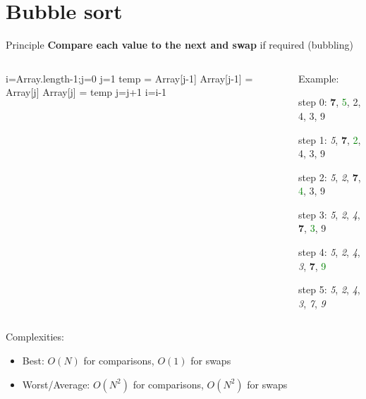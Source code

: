 \documentclass{beamer}[10pt, usepdftitle=false, handout]
\begin{document}
	\section {Bubble sort}

	\begin{frame}
	
	\begin{block}{Principle}
	\textbf{Compare each value to the next and swap} if required (bubbling)
	\end{block}	
	
	\begin{columns}[c]
	\begin{center}    
    \scalebox{0.75} {
    \begin{algorithm}[H]
	i=Array.length-1;j=0\;
	 {
		j=1\;
		 {
			 {
				temp = Array[j-1]\;			
				Array[j-1] = Array[j]\;
				Array[j] = temp\;			
			}	
			j=j+1\;	
		}	
		i=i-1\;
	}	
	
	\end{algorithm}	
	}
	\end{center}			
	
	\begin{center}
	
	\vspace*{1em}
	Example:
	\vspace*{1em}	
	
	step 0: \textbf{7}, \textcolor{green}{5}, 2, 4, 3, 9
	
	step 1: \textit{5}, \textbf{7}, \textcolor{green}{2}, 4, 3, 9

	step 2: \textit{5}, \textit{2}, \textbf{7}, \textcolor{green}{4}, 3, 9

	step 3: \textit{5}, \textit{2}, \textit{4}, \textbf{7}, \textcolor{green}{3}, 9

	step 4: \textit{5}, \textit{2}, \textit{4}, \textit{3}, \textbf{7}, \textcolor{green}{9}

	step 5: \textit{5}, \textit{2}, \textit{4}, \textit{3}, \textit{7}, \textit{9}

	\end{center}	
		
	\end{columns}
	
	\vspace*{1em}
	Complexities:
	
	\begin{itemize}
	\item {Best: $O(N)$ for comparisons, $O(1)$ for swaps}
	\item {Worst/Average: $O(N^2)$ for comparisons, $O(N^2)$ for swaps}
	\end{itemize}			
	
	\end{frame}
\end{document}
